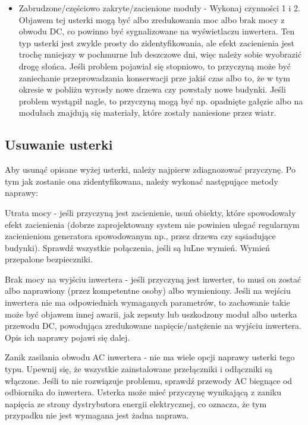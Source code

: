 \documentclass[12pt,a4paper]{article}
\begin{document}
\begin{itemize}
\item Zabrudzone/częściowo zakryte/zacienione moduły - Wykonaj czynności 
1 i 2. Objawem tej usterki mogą być albo zredukowania moc albo brak mocy 
z obwodu DC, co powinno być sygnalizowane na wyświetlaczu inwertera. Ten 
typ usterki jest zwykle prosty do zidentyfikowania, ale efekt 
zacienienia jest trochę mniejszy w pochmurne lub deszczowe dni, więc 
należy sobie wyobrazić drogę słońca. Jeśli problem pojawiał się 
stopniowo, to przyczyną może być zaniechanie przeprowadzania konserwacji 
prze jakiś czas albo to, że w tym okresie w pobliżu wyrosły nowe drzewa 
czy powstały nowe budynki. Jeśli problem wystąpił nagle, to przyczyną 
mogą być np. opadnięte gałęzie albo na modułach znajdują się materiały, 
które zostały naniesione przez wiatr. 
\end{itemize}
 

\subsection{Usuwanie usterki}
  

Aby usunąć opisane wyżej usterki, należy najpierw zdiagnozować 
przyczynę. Po tym jak zostanie ona zidentyfikowana, należy wykonać 
następujące metody naprawy: 

 

Utrata mocy - jeśli przyczyną jest zacienienie, usuń obiekty, które 
spowodowały efekt zacienienia (dobrze zaprojektowany system nie powinien 
ulegać regularnym zacienieniom generatora spowodowanym np., przez drzewa 
czy sąsiadujące budynki). Sprawdź wszystkie połączenia, jeśli są luĽne 
wymień. Wymień przepalone bezpieczniki. 

 

Brak mocy na wyjściu inwertera - jeśli przyczyną jest inwerter, to musi 
on zostać albo naprawiony (przez kompetentne osoby) albo wymieniony. 
Jeśli na wejściu inwertera nie ma odpowiednich wymaganych parametrów, to 
zachowanie takie może być objawem innej awarii, jak zepsuty lub 
uszkodzony moduł albo usterka przewodu DC, powodująca zredukowane 
napięcie/natężenie na wyjściu inwertera. Opis ich naprawy pojawi się 
dalej. 

 

Zanik zasilania obwodu AC inwertera - nie ma wiele opcji naprawy usterki 
tego typu. Upewnij się, że wszystkie zainstalowane przełączniki i 
odłączniki są włączone. Jeśli to nie rozwiązuje problemu, sprawdź 
przewody AC biegnące od odbiornika do inwertera. Usterka może mieć 
przyczynę wynikającą z zaniku napięcia ze strony dystrybutora energii 
elektrycznej, co oznacza, że tym przypadku nie jest wymagana jest żadna 
naprawa. 
\end{document}
